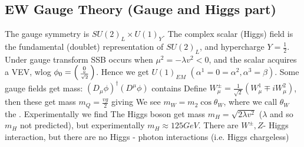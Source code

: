 \documentclass{article}
\begin{document}
\subsection{EW Gauge Theory (Gauge and Higgs part)}
The gauge symmetry is $SU(2)_L \times U(1)_Y$. The complex scalar (Higgs) field is the fundamental (doublet) representation of $SU(2)_L$, and hypercharge $Y=\frac{1}{2}$. Under gauge transform 
SSB occurs when $\mu^2 = -\lambda v^2 < 0$, and the scalar acquires a VEV, wlog $\phi_0 = \begin{psmallmatrix} 0 \\ \frac{v}{\sqrt{2}} \end{psmallmatrix}$. Hence we get $U(1)_{EM}$ $(\alpha^1 = 0 = \alpha^2, \alpha^3 = \beta)$. Some gauge fields get mass: $(D_\mu \phi)^\dagger (D^\mu \phi)$ contains 
Define $W_\mu^\pm = \frac{1}{\sqrt{2}} (W_\mu^1 \mp iW_\mu^2)$, then these get mass $m_Q = \frac{vg}{2}$ 
giving
We see $m_W = m_2 \cos\theta_W$, where we call $\theta_W$ the . Experimentally we find 
The Higgs boson get mass $m_H = \sqrt{2\lambda v^2}$ ($\lambda$ and so $m_H$ not predicted), but experimentally $m_H \approx 125 GeV$. There are $W^\pm,Z$- Higgs interaction, but there are no Higgs - photon interactions (i.e. Higgs chargeless) 
\end{document}

